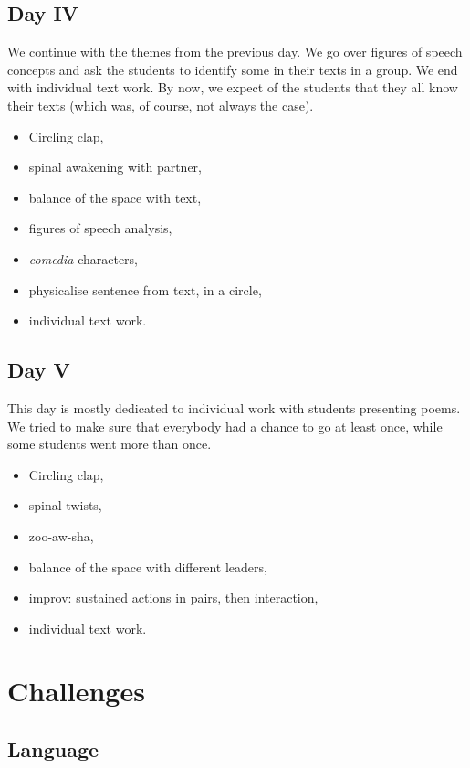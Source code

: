 \documentclass[article,twocolumn,twoside]{memoir}
\begin{document}
\section{Day IV}

We continue with the themes from the previous day. We go over figures of speech
concepts and ask the students to identify some in their texts in a group. We
end with individual text work. By now, we expect of the students that they all
know their texts (which was, of course, not always the case).

\begin{itemize}
\item Circling clap,
\item spinal awakening with partner,
\item balance of the space with text,
\item figures of speech analysis,
\item \textit{comedia} characters,
\item physicalise sentence from text, in a circle,
\item individual text work.
\end{itemize}
\section{Day V}

This day is mostly dedicated to individual work with students presenting poems.
We tried to make sure that everybody had a chance to go at least once, while
some students went more than once.

\begin{itemize}
\item Circling clap,
\item spinal twists,
\item zoo-aw-sha,
\item balance of the space with different leaders,
\item improv: sustained actions in pairs, then interaction,
\item individual text work.
\end{itemize}

\chapter{Challenges}
\section{Language}
\end{document}
